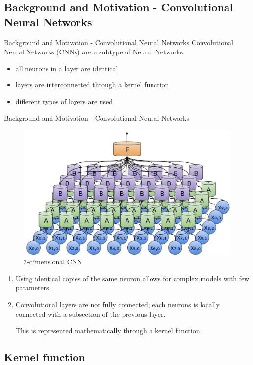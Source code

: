 \documentclass[12pt]{beamer}
\begin{document}
\subsection{Background and Motivation - Convolutional Neural Networks}
\begin{frame}{Background and Motivation - Convolutional Neural Networks}
Convolutional Neural Networks (CNNs) are a subtype of Neural Networks:
  \begin{itemize}
     \item all neurons in a layer are identical 
     \item layers are interconnected through a kernel function
     \item different types of layers are used %
  \end{itemize}
\end{frame}
\begin{frame}{Background and Motivation - Convolutional Neural Networks}
\begin{figure}
\centering
\includegraphics[width = 0.4\linewidth]{images/convexample.jpg}
\caption{2-dimensional CNN}
\label{fig:principle}
\end{figure}
\begin{enumerate}
\item Using identical copies of the same neuron allows for complex models with few parameters
\item Convolutional layers are not fully connected; each neurons is locally connected with a subsection of the previous layer.

This is represented mathematically through a kernel function.
\end{enumerate}
\end{frame}
\subsection{Kernel function}
\end{document}
